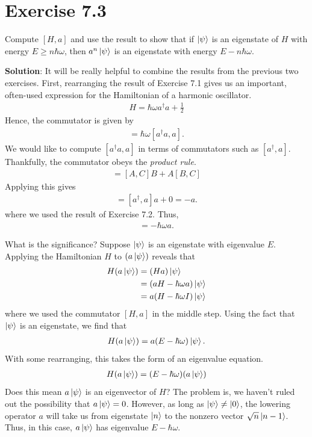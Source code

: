 \documentclass{book}
\begin{document}
\section*{Exercise 7.3}
    Compute $[H, a]$ and use the result to show that if $\ket{\psi}$ is an eigenstate of $H$ with energy $E \geq n\hbar \omega$, then $a^n \ket{\psi}$ is an eigenstate with energy $E - n\hbar \omega$.

    \textbf{Solution}: It will be really helpful to combine the results from the previous two exercises. First, rearranging the result of Exercise 7.1 gives us an important, often-used expression for the Hamiltonian of a harmonic oscillator.
    \begin{align}
        H = \hbar \omega a^\dagger a + \frac{1}{2}
    \end{align}
    Hence, the commutator is given by
    \begin{align}
        [H, a] = \hbar \omega [a^\dagger a , a].
    \end{align}
    We would like to compute $[a^\dagger a, a]$ in terms of commutators such as $[a^\dagger, a]$. Thankfully, the commutator obeys the \emph{product rule}. 
    \begin{align}
        [AB, C] = [A, C]B + A[B,C]
    \end{align}
    Applying this gives
    \begin{align}
        [a^\dagger a, a] = [a^\dagger, a] a + 0 = -a.
    \end{align}
    where we used the result of Exercise 7.2. Thus,
    \begin{align}
        [H,a] = -\hbar\omega a.
    \end{align}

    What is the significance? Suppose $\ket{\psi}$ is an eigenstate with eigenvalue $E$. Applying the Hamiltonian $H$ to $(a\ket{\psi})$ reveals that
    \begin{align}
    \begin{aligned}
        H (a\ket{\psi}) &= (Ha) \ket{\psi} \\
        &= (aH - \hbar \omega a)\ket{\psi} \\
        &= a(H- \hbar \omega I) \ket{\psi}
    \end{aligned}
    \end{align}
    where we used the commutator $[H,a]$ in the middle step. Using the fact that $\ket{\psi}$ is an eigenstate, we find that
    \begin{align}
        H(a\ket{\psi}) = a(E-\hbar\omega) \ket{\psi}.
    \end{align}
    With some rearranging, this takes the form of an eigenvalue equation.
    \begin{align}
        H(a\ket{\psi}) = (E-\hbar\omega) (a\ket{\psi})
    \end{align}
    Does this mean $a\ket{\psi}$ is an eigenvector of $H$? The problem is, we haven't ruled out the possibility that $a\ket{\psi} = 0$. However, as long as $\ket{\psi} \neq \ket{0}$, the lowering operator $a$ will take us from eigenstate $\ket{n}$ to the nonzero vector $\sqrt{n} \ket{n-1}$. Thus, in this case, $a\ket{\psi}$ has eigenvalue $E - \hbar \omega$.
\end{document}
